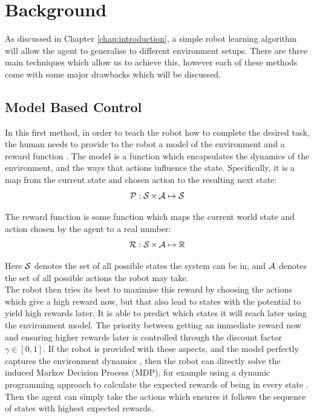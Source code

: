\chapter{Background}
\label{chap:background}

As discussed in Chapter \ref{chap:introduction}, a simple robot learning algorithm will allow the agent to generalise to different environment setups.
There are three main techniques which allow us to achieve this, however each of these methods come with some major drawbacks which will be discussed.

\section{Model Based Control}
\label{sec:model-based-control}
In this first method, in order to teach the robot how to complete the desired task, the human needs to provide to the robot a model of the environment and a reward function \cite{model-based-control}. The model is a function which encapsulates the dynamics of the environment, and the ways that actions influence the state. Specifically, it is a map from the current state and chosen action to the resulting next state:
$$\mathcal{P} : \operatorname{\mathcal{S}} \times \operatorname{\mathcal{A}} \mapsto \operatorname{\mathcal{S}}$$

The reward function is some function which maps the current world state and action chosen by the agent to a real number:
$$\operatorname{\mathcal{R}} : \operatorname{\mathcal{S}} \times \operatorname{\mathcal{A}} \mapsto \operatorname{\mathbb{R}}$$

Here $\operatorname{\mathcal{S}}$ denotes the set of all possible states the system can be in, and $\operatorname{\mathcal{A}}$ denotes the set of all possible actions the robot may take.\\

The robot then tries its best to maximise this reward by choosing the actions which give a high reward now, but that also lead to states with the potential to yield high rewards later. It is able to predict which states it will reach later using the environment model. The priority between getting an immediate reward now and ensuring higher rewards later is controlled through the discount factor $\gamma \in [0,1]$. If the robot is provided with these aspects, and the model perfectly captures the environment dynamics , then the robot can directly solve the induced Markov Decision Process (MDP), for example using a dynamic programming approach to calculate the expected rewards of being in every state \cite{rl-intro-book}. Then the agent can simply take the actions which ensures it follows the sequence of states with highest expected rewards.\\

